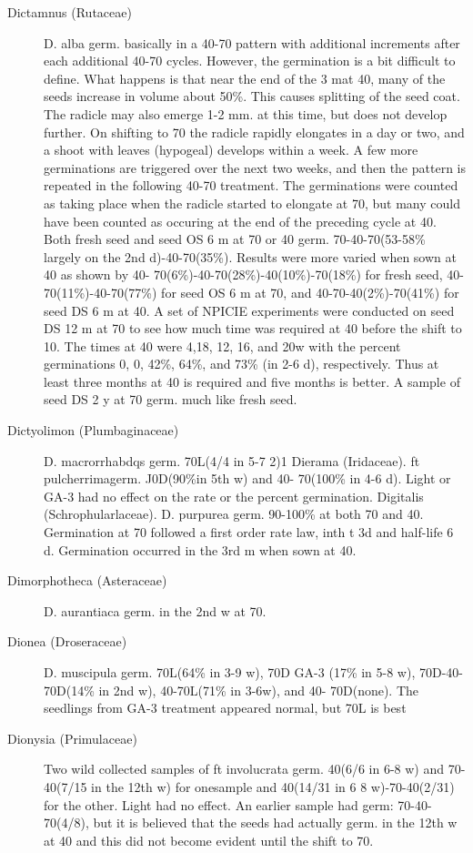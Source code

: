 \begin{description}
\item[Dictamnus (Rutaceae)] D. alba germ. basically in a 40-70 pattern with
additional increments after each additional 40-70 cycles. However, the germination is
a bit difficult to define. What happens is that near the end of the 3 mat 40, many of the
seeds increase in volume about 50\%. This causes splitting of the seed coat. The
radicle may also emerge 1-2 mm. at this time, but does not develop further. On shifting
to 70 the radicle rapidly elongates in a day or two, and a shoot with leaves (hypogeal)
develops within a week. A few more germinations are triggered over the next two
weeks, and then the pattern is repeated in the following 40-70 treatment. The
germinations were counted as taking place when the radicle started to elongate at 70,
but many could have been counted as occuring at the end of the preceding cycle at
40. Both fresh seed and seed OS 6 m at 70 or 40 germ. 70-40-70(53-58\% largely on
the 2nd d)-40-70(35\%). Results were more varied when sown at 40 as shown by 40-
70(6\%)-40-70(28\%)-40(10\%)-70(18\%) for fresh seed, 40-70(11\%)-40-70(77\%) for
seed OS 6 m at 70, and 40-70-40(2\%)-70(41\%) for seed DS 6 m at 40. A set of NPICIE
experiments were conducted on seed DS 12 m at 70 to see how much time was
required at 40 before the shift to 10. The times at 40 were 4,18, 12, 16, and 20w with
the percent germinations 0, 0, 42\%, 64\%, and 73\% (in 2-6 d), respectively. Thus at
least three months at 40 is required and five months is better. A sample of seed DS 2
y at 70 germ. much like fresh seed.

\item[Dictyolimon (Plumbaginaceae)] D. macrorrhabdqs germ. 70L(4/4 in 5-7
2)1 Dierama (Iridaceae). ft pulcherrimagerm. J0D(90\%in 5th w) and 40-
70(100\% in 4-6 d). Light or GA-3 had no effect on the rate or the percent germination.
Digitalis (Schrophularlaceae). D. purpurea germ. 90-100\% at both 70
and 40. Germination at 70 followed a first order rate law, inth t 3d and half-life 6 d.
Germination occurred in the 3rd m when sown at 40.

\item[Dimorphotheca (Asteraceae)] D. aurantiaca germ. in the 2nd w at 70.
\item[Dionea (Droseraceae)] D. muscipula germ. 70L(64\% in 3-9 w), 70D GA-3
(17\% in 5-8 w), 70D-40-70D(14\% in 2nd w), 40-70L(71\% in 3-6w), and 40-
70D(none). The seedlings from GA-3 treatment appeared normal, but 70L is best
\item[Dionysia (Primulaceae)] Two wild collected samples of ft involucrata
germ. 40(6/6 in 6-8 w) and 70-40(7/15 in the 12th w) for onesample and 40(14/31 in 6
8 w)-70-40(2/31) for the other. Light had no effect. An earlier sample had germ: 70-40-
70(4/8), but it is believed that the seeds had actually germ. in the 12th w at 40 and this
did not become evident until the shift to 70.


\end{description}
